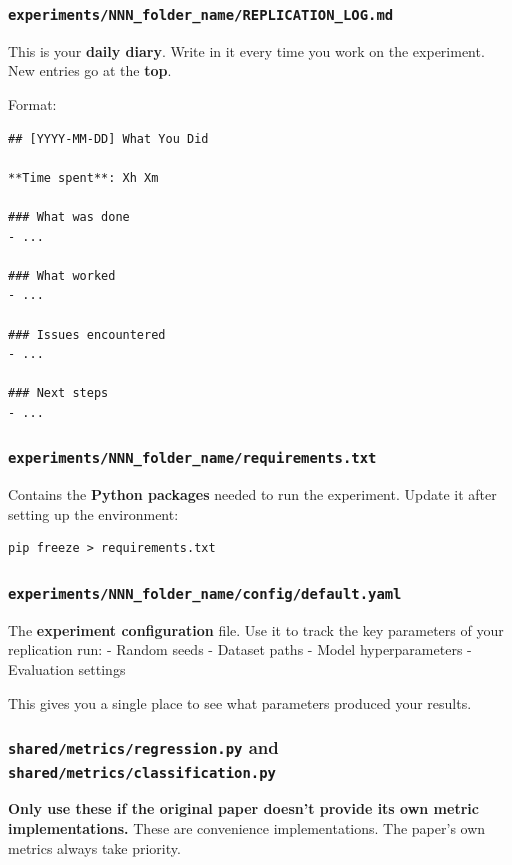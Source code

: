 \subsubsection{\texorpdfstring{\texttt{experiments/NNN\_folder\_name/REPLICATION\_LOG.md}}{experiments/NNN\_folder\_name/REPLICATION\_LOG.md}}\label{experimentsnnn_folder_namereplication_log.md}

This is your \textbf{daily diary}. Write in it every time you work on
the experiment. New entries go at the \textbf{top}.

Format:

\begin{verbatim}
## [YYYY-MM-DD] What You Did

**Time spent**: Xh Xm

### What was done
- ...

### What worked
- ...

### Issues encountered
- ...

### Next steps
- ...
\end{verbatim}

\subsubsection{\texorpdfstring{\texttt{experiments/NNN\_folder\_name/requirements.txt}}{experiments/NNN\_folder\_name/requirements.txt}}\label{experimentsnnn_folder_namerequirements.txt}

Contains the \textbf{Python packages} needed to run the experiment.
Update it after setting up the environment:

\begin{verbatim}
pip freeze > requirements.txt
\end{verbatim}

\subsubsection{\texorpdfstring{\texttt{experiments/NNN\_folder\_name/config/default.yaml}}{experiments/NNN\_folder\_name/config/default.yaml}}\label{experimentsnnn_folder_nameconfigdefault.yaml}

The \textbf{experiment configuration} file. Use it to track the key
parameters of your replication run: - Random seeds - Dataset paths -
Model hyperparameters - Evaluation settings

This gives you a single place to see what parameters produced your
results.

\subsubsection{\texorpdfstring{\texttt{shared/metrics/regression.py} and
\texttt{shared/metrics/classification.py}}{shared/metrics/regression.py and shared/metrics/classification.py}}\label{sharedmetricsregression.py-and-sharedmetricsclassification.py}

\textbf{Only use these if the original paper doesn't provide its own
metric implementations.} These are convenience implementations. The
paper's own metrics always take priority.
